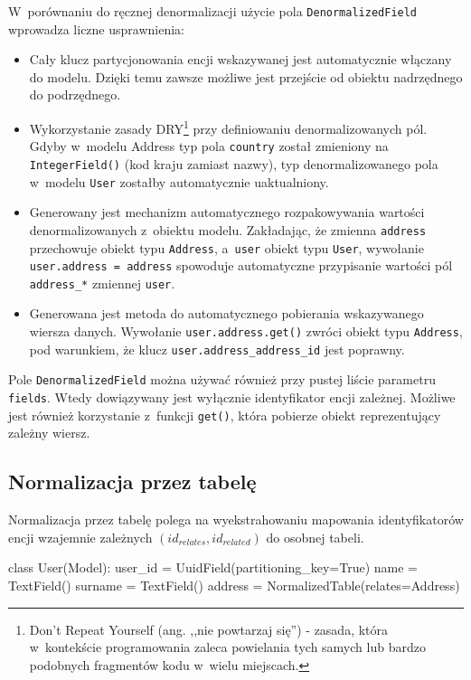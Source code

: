 W~porównaniu do ręcznej denormalizacji użycie pola \verb+DenormalizedField+ wprowadza liczne usprawnienia:

\begin{itemize}
	\item Cały klucz partycjonowania encji wskazywanej jest automatycznie włączany do modelu. Dzięki temu zawsze możliwe jest przejście od obiektu nadrzędnego do podrzędnego.
	\item Wykorzystanie zasady DRY\footnote{Don't Repeat Yourself (ang. ,,nie powtarzaj się'') - zasada, która w~kontekście programowania zaleca powielania tych samych lub bardzo podobnych fragmentów kodu w~wielu miejscach.} przy definiowaniu denormalizowanych pól. Gdyby w~modelu Address typ pola \verb+country+ został zmieniony na \verb+IntegerField()+ (kod kraju zamiast nazwy), typ denormalizowanego pola w~modelu \verb+User+ zostałby automatycznie uaktualniony.
	\item Generowany jest mechanizm automatycznego rozpakowywania wartości denormalizowanych z~obiektu modelu. Zakładając, że zmienna \verb+address+ przechowuje obiekt typu \verb+Address+, a~\verb+user+ obiekt typu \verb+User+, wywołanie \verb+user.address = address+ spowoduje automatyczne przypisanie wartości pól \verb+address_*+ zmiennej \verb+user+.
	\item Generowana jest metoda do automatycznego pobierania wskazywanego wiersza danych. Wywołanie \verb+user.address.get()+ zwróci obiekt typu \verb+Address+, pod warunkiem, że klucz \verb+user.address_address_id+ jest poprawny.
\end{itemize}

Pole \verb+DenormalizedField+ można używać również przy pustej liście parametru \verb+fields+. Wtedy dowiązywany jest wyłącznie identyfikator encji zależnej. Możliwe jest również korzystanie z~funkcji \verb+get()+, która pobierze obiekt reprezentujący zależny wiersz.

\subsection{Normalizacja przez tabelę}

Normalizacja przez tabelę polega na wyekstrahowaniu mapowania identyfikatorów encji wzajemnie zależnych $(id_{relates}, id_{related})$ do osobnej tabeli. 

\begin{verbbox}
class User(Model):
    user_id = UuidField(partitioning_key=True)
    name = TextField()
    surname = TextField()
    address = NormalizedTable(relates=Address)
\end{verbbox}

